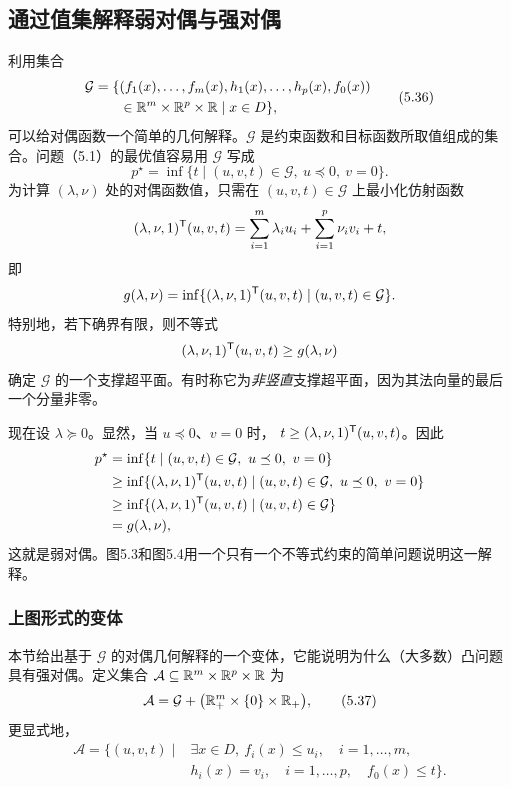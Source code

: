 \subsection{通过值集解释弱对偶与强对偶}
利用集合
\begin{equation}
\begin{split}
\mathcal G=\{&(f_1(x),\ldots,f_m(x),h_1(x),\ldots,h_p(x),f_0(x))\\
&\in\mathbb R^m\times\mathbb R^p\times\mathbb R\mid x\in D\},
\end{split}\tag{5.36}
\end{equation}
可以给对偶函数一个简单的几何解释。$\mathcal G$ 是约束函数和目标函数所取值组成的集合。问题（5.1）的最优值容易用 $\mathcal G$ 写成
\[
p^\star=\inf\{t\mid(u,v,t)\in\mathcal G,\ u\preceq0,\ v=0\}.
\]
为计算 $(\lambda,\nu)$ 处的对偶函数值，只需在 $(u,v,t)\in\mathcal G$ 上最小化仿射函数
\[
(\lambda,\nu,1)^\mathsf T(u,v,t)=\sum_{i=1}^m\lambda_i u_i+\sum_{i=1}^p\nu_i v_i+t,
\]
即
\[
g(\lambda,\nu)=\inf\{(\lambda,\nu,1)^\mathsf T(u,v,t)\mid(u,v,t)\in\mathcal G\}.
\]
特别地，若下确界有限，则不等式
\[
(\lambda,\nu,1)^\mathsf T(u,v,t)\ge g(\lambda,\nu)
\]
确定 $\mathcal G$ 的一个支撑超平面。有时称它为\emph{非竖直}支撑超平面，因为其法向量的最后一个分量非零。

现在设 $\lambda\succeq0$。显然，当 $u\preceq0$、$v=0$ 时，
$t\ge(\lambda,\nu,1)^\mathsf T(u,v,t)$。因此
\[
\begin{aligned}
p^\star&=\inf\{t\mid(u,v,t)\in\mathcal G,\ u\preceq0,\ v=0\}\\
&\ge\inf\{(\lambda,\nu,1)^\T(u,v,t)\mid(u,v,t)\in\mathcal G,\ u\preceq0,\ v=0\}\\
&\ge\inf\{(\lambda,\nu,1)^\T(u,v,t)\mid(u,v,t)\in\mathcal G\}\\
&=g(\lambda,\nu),
\end{aligned}
\]
这就是弱对偶。图5.3和图5.4用一个只有一个不等式约束的简单问题说明这一解释。

\subsubsection*{上图形式的变体}
本节给出基于 $\mathcal G$ 的对偶几何解释的一个变体，它能说明为什么（大多数）凸问题具有强对偶。定义集合 $\mathcal A\subseteq\mathbb R^m\times\mathbb R^p\times\mathbb R$ 为
\begin{equation}
\mathcal A=\mathcal G+\bigl(\mathbb R_+^m\times\{0\}\times\mathbb R_+\bigr),\tag{5.37}
\end{equation}
更显式地，
\[
\begin{split}
\mathcal A=\{(u,v,t)\mid{}&\exists x\in D,\ f_i(x)\le u_i,\quad i=1,\ldots,m,\\
&h_i(x)=v_i,\quad i=1,\ldots,p,\quad f_0(x)\le t\}.
\end{split}
\]

